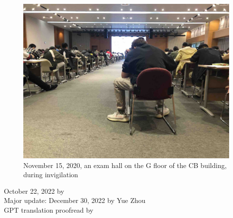 \begin{figure}[H]
    \centering
    \includegraphics[width=0.9\columnwidth]{author-folder/Kai.Wu/invigilation.jpg}
    \caption{November 15, 2020, an exam hall on the G floor of the CB building, during invigilation}
\end{figure}

\begin{flushright}
    October 22, 2022 by \Wu \\
    Major update: December 30, 2022 by Yue Zhou \\
    GPT translation proofread by \Shiyao
\end{flushright}




% 
